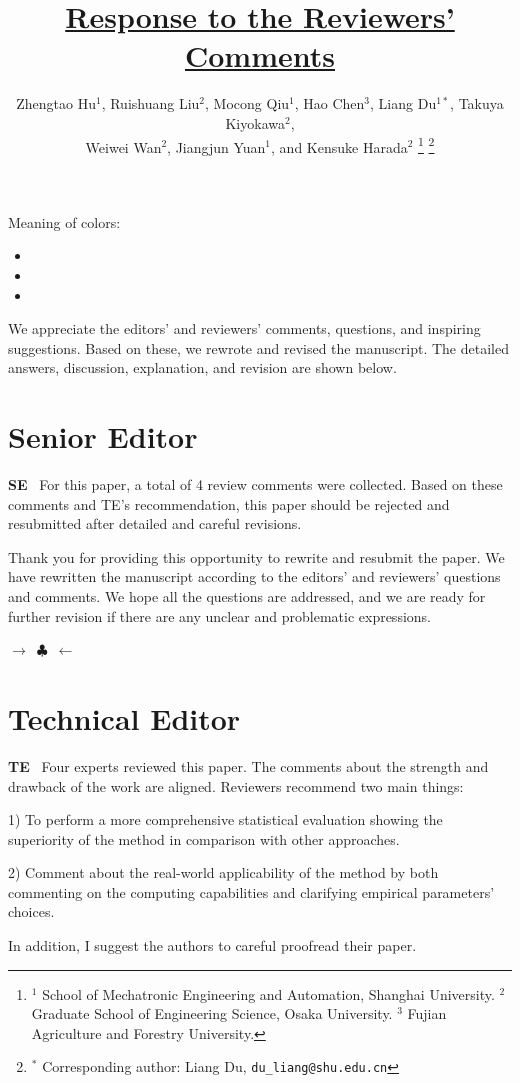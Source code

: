 \documentclass[journal]{IEEEtran}
\title{\uline{Response to the Reviewers' Comments}\\
\subtt{Planning 6D Grasps for Two-Finger Grippers considering Edge and Corner Contacts}}
\author{Zhengtao Hu$^{1}$, Ruishuang Liu$^{2}$, Mocong Qiu$^{1}$, Hao Chen$^{3}$, Liang Du$^{1*}$, Takuya Kiyokawa$^{2}$,\\ Weiwei Wan$^{2}$, Jiangjun Yuan$^{1}$, and Kensuke Harada$^{2}$
\thanks{$^{1}$ School of Mechatronic Engineering and Automation, Shanghai University. $^{2}$ Graduate School of Engineering Science, Osaka University. $^{3}$ Fujian Agriculture and Forestry University.}
\thanks{$^{*}$ Corresponding author: Liang Du, {\tt\small du\_liang@shu.edu.cn}}%
}
\newcommand{\ornamentbreak}{%
\begin{center}
    $\longrightarrow$~$\clubsuit$~$\longleftarrow$
  \end{center}
}
\begin{document}
\maketitle

Meaning of colors:
\begin{itemize}
\item \color{gray}{Comments and suggestions from the reviewers.}
\item \color{black}{Our response.}
\item \color{red}{Revisions in the manuscript.}
\end{itemize}

We appreciate the editors' and reviewers' comments, questions, and inspiring suggestions. Based on these, we rewrote and revised the manuscript. The detailed answers, discussion, explanation, and revision are shown below.


\section{Senior Editor}

\noindent
{\textbf{\color{black}SE}\color{gray}~ For this paper, a total of 4 review comments were collected. Based on these comments and TE's recommendation, this paper should be rejected and resubmitted after detailed and careful revisions.
}

Thank you for providing this opportunity to rewrite and resubmit the paper. We have rewritten the manuscript according to the editors' and reviewers' questions and comments. We hope all the questions are addressed, and we are ready for further revision if there are any unclear and problematic expressions.

\ornamentbreak

\section{Technical Editor}

\noindent
{\textbf{\color{black}TE}\color{gray}~ Four experts reviewed this paper. The comments about the strength and drawback of the work are aligned. Reviewers recommend two main things:  

1) To perform a more comprehensive statistical evaluation showing the superiority of the method in comparison with other approaches.

2) Comment about the real-world applicability of the method by both commenting on the computing capabilities and clarifying empirical parameters' choices.

In addition, I suggest the authors to careful proofread their paper.
}
\end{document}
